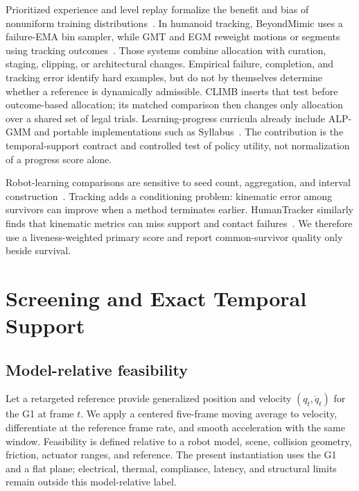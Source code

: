 \documentclass[letterpaper,10pt,conference]{ieeeconf}
\newcommand{\method}{CLIMB}
\begin{document}
Prioritized experience and level replay formalize the benefit and bias of nonuniform training
distributions~\cite{schaul2016per,jiang2021plr}. In humanoid tracking, BeyondMimic uses a
failure-EMA bin sampler, while GMT and EGM reweight motions or segments using tracking
outcomes~\cite{liao2025beyondmimic,chen2025gmt,yang2025egm}. Those systems combine allocation with
curation, staging, clipping, or architectural changes. Empirical failure, completion, and tracking
error identify hard examples, but do not by themselves determine whether a reference is
dynamically admissible. \method{} inserts that test before outcome-based allocation; its matched
comparison then changes only allocation over a shared set of legal trials.
Learning-progress curricula already include ALP-GMM and portable implementations
such as Syllabus~\cite{portelas2019teacher,sullivan2025syllabus}. The contribution
is the temporal-support contract and controlled test of policy utility, not
normalization of a progress score alone.

Robot-learning comparisons are sensitive to seed count, aggregation, and interval
construction~\cite{agarwal2021precipice}. Tracking adds a conditioning problem: kinematic error
among survivors can improve when a method terminates earlier. HumanTracker similarly finds that
kinematic metrics can miss support and contact failures~\cite{liu2026humantracker}. We therefore
use a liveness-weighted primary score and report common-survivor quality only beside survival.

\section{Screening and Exact Temporal Support}

\subsection{Model-relative feasibility}

Let a retargeted reference provide generalized position and velocity
$(q_t,\dot q_t)$ for the G1 at frame $t$. We apply a centered five-frame moving average to
velocity, differentiate at the reference frame rate, and smooth acceleration with the same
window. Feasibility is defined relative to a robot model, scene, collision geometry, friction,
actuator ranges, and reference. The present instantiation uses the G1 and a flat plane; electrical,
thermal, compliance, latency, and structural limits remain outside this model-relative label.
\end{document}
